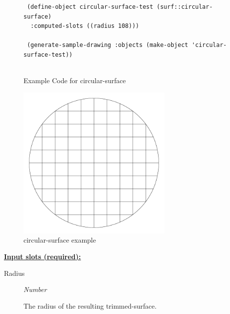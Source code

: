 \documentclass [11pt]{book}
\begin{document}
\begin{itemize}
\begin{figure}
\begin{lrbox}{\boxedverb}
\begin{minipage}{\linewidth}
{\begin{verbatim}
 (define-object circular-surface-test (surf::circular-surface)
  :computed-slots ((radius 108)))

 (generate-sample-drawing :objects (make-object 'circular-surface-test))


\end{verbatim}}
\end{minipage}
\end{lrbox}
\fbox{\usebox{\boxedverb}}

\caption{Example Code for circular-surface}

\label{fig:example-code-circular-surface}

\end{figure}

\begin{figure}
\begin{center}
\includegraphics[width=3in,height=3in]{../images/example-circular-surface.pdf}
\end{center}

\caption{circular-surface example}

\label{fig:circular-surface}

\end{figure}





\textbf{
\underline{Input slots (required):}}

\begin{description}

\item [Radius]
\emph{Number}

 The radius of the resulting trimmed-surface.




\end{description}







\end{itemize}
\end{document}
